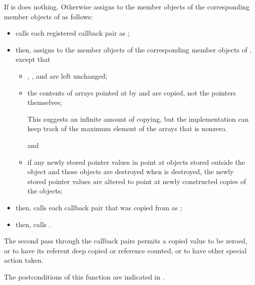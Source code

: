 \begin{itemdescr}
\pnum
\effects
If
 is 
does nothing.
Otherwise assigns to the member objects of
the corresponding member objects of  as follows:

\begin{itemize}
\item calls each registered callback pair  as
;

\item then, assigns to the member objects of  the corresponding member objects of
, except that

\begin{itemize}
\item {}, , and  are left unchanged;

\item the contents of arrays pointed at by  and  are copied,
not the pointers themselves;
\begin{footnote}
 This suggests an infinite amount of copying, but the implementation can keep
track of the maximum element of the arrays that is nonzero.
\end{footnote}
and

\item if any newly stored pointer values in  point at objects stored outside
the object  and those objects are destroyed when  is destroyed, the
newly stored pointer values are altered to point at newly constructed copies of the
objects;
\end{itemize}

\item then, calls each callback pair that was copied from  as
;

\item then, calls .
\end{itemize}

\pnum
\begin{note}
The second pass through the callback pairs permits a copied 
value to be zeroed, or to have its referent deep copied or reference counted, or to have
other special action taken.
\end{note}

\pnum
\ensures
The postconditions of this function are indicated in .


\end{itemdescr}
